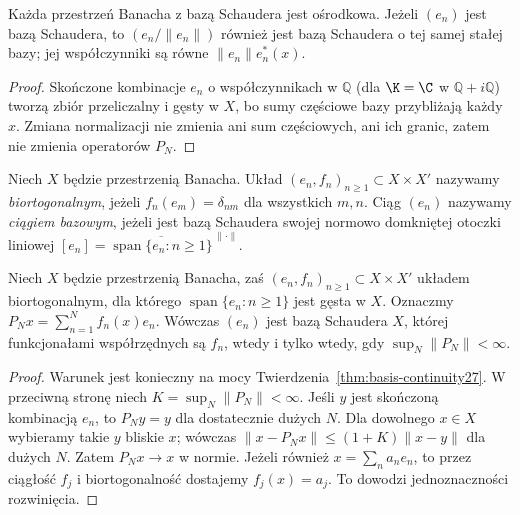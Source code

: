 \begin{wniosek}
\label{cor:separable27}
Każda przestrzeń Banacha z bazą Schaudera jest ośrodkowa.
Jeżeli $(e_n)$ jest bazą Schaudera, to
$(e_n/\|e_n\|)$ również jest bazą Schaudera o tej samej stałej
bazy; jej współczynniki są równe $\|e_n\|e_n^*(x)$.
\end{wniosek}
\begin{proof}
Skończone kombinacje $e_n$ o współczynnikach w $\mathbb Q$
(dla $\K=\C$ w $\mathbb Q+i\mathbb Q$) tworzą zbiór przeliczalny
i gęsty w $X$, bo sumy częściowe bazy przybliżają każdy $x$.
Zmiana normalizacji nie zmienia ani sum częściowych,
ani ich granic, zatem nie zmienia operatorów $P_N$.
\end{proof}

\begin{definicja}
\label{def:biorthogonal27}
Niech $X$ będzie przestrzenią Banacha.
Układ $(e_n,f_n)_{n\ge1}\subset X\times X'$ nazywamy
\emph{biortogonalnym}, jeżeli $f_n(e_m)=\delta_{nm}$
dla wszystkich $m,n$. Ciąg $(e_n)$ nazywamy
\emph{ciągiem bazowym}, jeżeli jest bazą Schaudera swojej
normowo domkniętej otoczki liniowej $[e_n]
=\overline{\operatorname{span}\{e_n:n\ge1\}}^{\,\|\cdot\|}$.
\end{definicja}

\begin{twierdzenie}
\label{thm:biorthogonal-criterion27}
Niech $X$ będzie przestrzenią Banacha, zaś
$(e_n,f_n)_{n\ge1}\subset X\times X'$ układem biortogonalnym,
dla którego $\operatorname{span}\{e_n:n\ge1\}$ jest gęsta w $X$.
Oznaczmy $P_Nx=\sum_{n=1}^Nf_n(x)e_n$.
Wówczas $(e_n)$ jest bazą Schaudera $X$, której
funkcjonałami współrzędnych są $f_n$, wtedy i tylko wtedy,
gdy $\sup_N\|P_N\|<\infty$.
\end{twierdzenie}
\begin{proof}
Warunek jest konieczny na mocy
Twierdzenia~\ref{thm:basis-continuity27}.
W przeciwną stronę niech $K=\sup_N\|P_N\|<\infty$.
Jeśli $y$ jest skończoną kombinacją $e_n$, to $P_Ny=y$
dla dostatecznie dużych $N$. Dla dowolnego $x\in X$
wybieramy takie $y$ bliskie $x$; wówczas
$\|x-P_Nx\|\le(1+K)\|x-y\|$ dla dużych $N$.
Zatem $P_Nx\to x$ w normie.
Jeżeli również $x=\sum_na_ne_n$, to przez ciągłość $f_j$
i biortogonalność dostajemy $f_j(x)=a_j$.
To dowodzi jednoznaczności rozwinięcia.
\end{proof}

